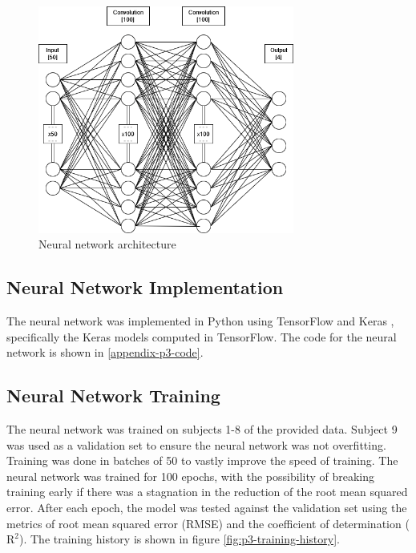 \documentclass[12pt]{article}
\begin{document}
\begin{figure}[H]
    \centering
    \includegraphics[width=0.75\textwidth]{Problem 3/assets/NeuralNet.png}
    \caption{Neural network architecture}
    \label{fig:p3-nn-architecture}
\end{figure}

\subsection{Neural Network Implementation}
The neural network was implemented in Python using TensorFlow \cite{tensorflow} and Keras \cite{keras}, specifically the Keras models computed in TensorFlow. The code for the neural network is shown in \ref{appendix-p3-code}.

\subsection{Neural Network Training}
The neural network was trained on subjects 1-8 of the provided data. Subject 9 was used as a validation set to ensure the neural network was not overfitting. Training was done in batches of 50 to vastly improve the speed of training. The neural network was trained for 100 epochs, with the possibility of breaking training early if there was a stagnation in the reduction of the root mean squared error. After each epoch, the model was tested against the validation set using the metrics of root mean squared error (RMSE) and the coefficient of determination ($\text{R}^2$). The training history is shown in figure \ref{fig:p3-training-history}.
\end{document}

